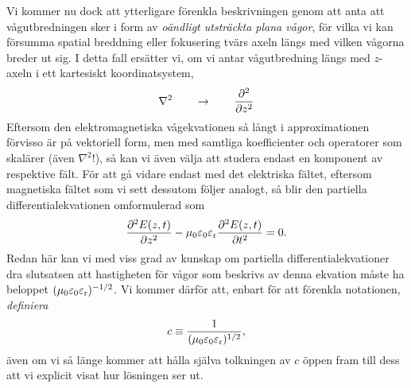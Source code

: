 {{{{{Vi kommer nu dock att ytterligare f{\"o}renkla beskrivningen genom att anta att
v{\aa}gutbredningen sker i form av {\it o{\"a}ndligt utstr{\"a}ckta plana
v{\aa}gor}, f{\"o}r vilka vi kan f{\"o}rsumma spatial breddning eller
fokusering tv{\"a}rs axeln l{\"a}ngs med vilken v{\aa}gorna breder ut sig.
I detta fall ers{\"a}tter vi, om vi antar v{\aa}gutbredning l{\"a}ngs med
$z$-axeln i ett kartesiskt koordinatsystem,
\hl{$$
  \nabla^2\qquad\to\qquad{{\partial^2}\over{\partial z^2}}
$$}
Eftersom den elektromagnetiska v{\aa}gekvationen s{\aa} l{\aa}ngt i
approximationen f{\"o}rvisso {\"a}r p{\aa} vektoriell form, men med samtliga
koefficienter och operatorer som skal{\"a}rer ({\"a}ven $\nabla^2$!), s{\aa}
kan vi {\"a}ven v{\"a}lja att studera endast en komponent av respektive
f{\"a}lt. F{\"o}r att g{\aa} vidare endast med det elektriska f{\"a}ltet,
eftersom magnetiska f{\"a}ltet som vi sett dessutom f{\"o}ljer analogt, s{\aa}
blir den partiella differentialekvationen omformulerad som
\hl{$$
  {{\partial^2 E(z,t)}\over{\partial z^2}}
    -\mu_0\varepsilon_0\varepsilon_{\rm r}
      {{\partial^2 E(z,t)}\over{\partial t^2}} = 0.
$$}
Redan h{\"a}r kan vi med viss grad av kunskap om partiella
differentialekvationer dra slutsatsen att hastigheten f{\"o}r v{\aa}gor som
beskrivs av denna ekvation m{\aa}ste ha beloppet
$(\mu_0\varepsilon_0\varepsilon_{\rm r})^{-1/2}$.
Vi kommer d{\"a}rf{\"o}r att, enbart f{\"o}r att f{\"o}renkla notationen,
{\it definiera}
\hl{$$
  c \equiv {{1}\over{(\mu_0\varepsilon_0\varepsilon_{\rm r})^{1/2}}},
$$}
{\"a}ven om vi s{\aa} l{\"a}nge kommer att h{\aa}lla sj{\"a}lva tolkningen av
$c$ {\"o}ppen fram till dess att vi explicit visat hur l{\"o}sningen ser ut.
\vfill\eject

}}}}}
